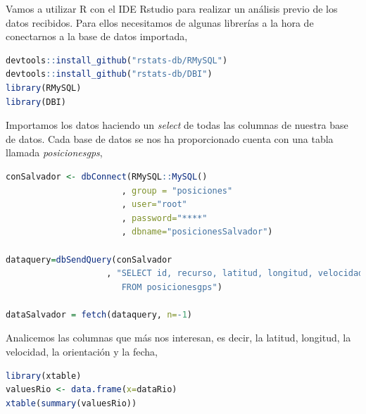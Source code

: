 \documentclass[a4paper, 12pt]{article}
\begin{document}
Vamos a utilizar R con el IDE Rstudio para realizar un an\'alisis previo de los datos recibidos. Para ellos necesitamos de algunas librer\'ias a la hora de conectarnos a la base de datos importada,\\

\begin{lstlisting}[language=R, columns=fullflexible, basicstyle=\small]
devtools::install_github("rstats-db/RMySQL")
devtools::install_github("rstats-db/DBI")
library(RMySQL)
library(DBI)
\end{lstlisting}

Importamos los datos haciendo un \textit{select} de todas las columnas de nuestra base de datos. Cada base de datos se nos ha proporcionado cuenta con una tabla llamada \textit{posicionesgps},\\

\begin{lstlisting}[language=R, columns=fullflexible, basicstyle=\small]
conSalvador <- dbConnect(RMySQL::MySQL()
					   , group = "posiciones"
					   , user="root"
					   , password="****"
					   , dbname="posicionesSalvador")

dataquery=dbSendQuery(conSalvador
					, "SELECT id, recurso, latitud, longitud, velocidad, orientacion, error, antigua, fecha 
					   FROM posicionesgps")

dataSalvador = fetch(dataquery, n=-1)
\end{lstlisting}

Analicemos las columnas que m\'as nos interesan, es decir, la latitud, longitud, la velocidad, la orientaci\'on y la fecha, \\

\begin{lstlisting}[language=R, basicstyle=\small, columns=fullflexible]
library(xtable)
valuesRio <- data.frame(x=dataRio)
xtable(summary(valuesRio))
\end{lstlisting}

\bigskip 
\end{document}
